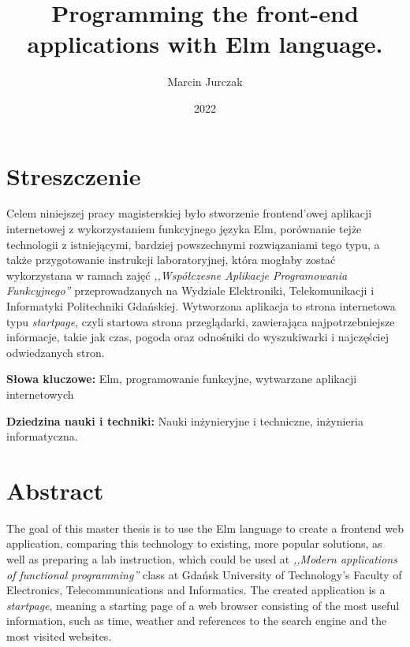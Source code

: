 \documentclass[twoside,a4paper]{report}
\begin{document}


\title{Programming the front-end applications with Elm language.}
\author{Marcin Jurczak}
\date{2022}

\maketitle
{}


\chapter*{Streszczenie}
\noindent
Celem niniejszej pracy magisterskiej było stworzenie frontend'owej aplikacji internetowej z wykorzystaniem funkcyjnego języka Elm, porównanie tejże technologii z istniejącymi, bardziej powszechnymi rozwiązaniami tego typu, a także przygotowanie instrukcji laboratoryjnej, która mogłaby zostać wykorzystana w ramach zajęć \textit{,,Współczesne Aplikacje Programowania Funkcyjnego''} przeprowadzanych na Wydziale Elektroniki, Telekomunikacji i Informatyki Politechniki Gdańskiej.
Wytworzona aplikacja to strona internetowa typu \textit{startpage}, czyli startowa strona przeglądarki, zawierająca najpotrzebniejsze informacje, takie jak czas, pogoda oraz odnośniki do wyszukiwarki i najczęściej odwiedzanych stron.

\textbf{Słowa kluczowe:} Elm, programowanie funkcyjne, wytwarzane aplikacji internetowych

\textbf{Dziedzina nauki i techniki: }Nauki inżynieryjne i techniczne, inżynieria informatyczna.

\vspace{80pt}
{\let\clearpage\relax\chapter*{Abstract}}
\noindent
The goal of this master thesis is to use the Elm language to create a frontend web application, comparing this technology to existing, more popular solutions, as well as preparing a lab instruction, which could be used at \textit{,,Modern applications of functional programming''} class at Gdańsk University of Technology’s Faculty of Electronics, Telecommunications and Informatics.
The created application is a \textit{startpage}, meaning a starting page of a web browser consisting of the most useful information, such as time, weather and references to the search engine and the most visited websites.
\end{document}
